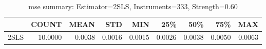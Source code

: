 \begin{table}[ht]
\centering
\caption{mse summary: Estimator=2SLS, Instruments=333, Strength=0.60}
\begin{tabular}{lrrrrrrrr}
\toprule
 & COUNT & MEAN & STD & MIN & 25\% & 50\% & 75\% & MAX \\
\midrule
2SLS & 10.0000 & 0.0038 & 0.0016 & 0.0015 & 0.0026 & 0.0038 & 0.0050 & 0.0063 \\
\bottomrule
\end{tabular}
\end{table}

